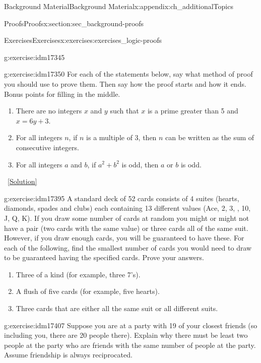\documentclass[oneside,10pt,]{book}
\numberwithin{equation}{chapter}
\begin{document}
\begin{appendixptx}{Background Material}{}{Background Material}{}{}{x:appendix:ch_additionalTopics}
\begin{sectionptx}{Proofs}{}{Proofs}{}{}{x:section:sec_background-proofs}
\begin{exercises-subsection}{Exercises}{}{Exercises}{}{}{x:exercises:exercises_logic-proofs}
\begin{divisionexercise}{14}{}{}{g:exercise:idm17345}
\end{divisionexercise}%
\begin{divisionexercise}{15}{}{}{g:exercise:idm17350}%
For each of the statements below, say what method of proof you should use to prove them. Then say how the proof starts and how it ends. Bonus points for filling in the middle.%
\par
%
\begin{enumerate}[label=(\alph*)]
\item{}There are no integers \(x\) and \(y\) such that \(x\) is a prime greater than 5 and \(x = 6y + 3\).%
\item{}For all integers \(n\), if \(n\) is a multiple of 3, then \(n\) can be written as the sum of consecutive integers.%
\item{}For all integers \(a\) and \(b\), if \(a^2 + b^2\) is odd, then \(a\) or \(b\) is odd.%
\end{enumerate}
%
\qquad~\hfill{\tiny\hyperlink{g:solution:idm17373-main}{[Solution]}}\end{divisionexercise}%
\begin{divisionexercise}{16}{}{}{g:exercise:idm17395}%
A standard deck of 52 cards consists of 4 suites (hearts, diamonds, spades and clubs) each containing 13 different values (Ace, 2, 3, \textellipsis{}, 10, J, Q, K). If you draw some number of cards at random you might or might not have a pair (two cards with the same value) or three cards all of the same suit. However, if you draw enough cards, you will be guaranteed to have these. For each of the following, find the smallest number of cards you would need to draw to be guaranteed having the specified cards. Prove your answers.%
\par
%
\begin{enumerate}[label=(\alph*)]
\item{}Three of a kind (for example, three 7's). %
\item{}A flush of five cards (for example, five hearts). %
\item{}Three cards that are either all the same suit or all different suits. %
\end{enumerate}
%
\end{divisionexercise}%
\begin{divisionexercise}{17}{}{}{g:exercise:idm17407}%
Suppose you are at a party with 19 of your closest friends (so including you, there are 20 people there). Explain why there must be least two people at the party who are friends with the same number of people at the party. Assume friendship is always reciprocated.%

\end{divisionexercise}
\end{exercises-subsection}
\end{sectionptx}
\end{appendixptx}
\end{document}
